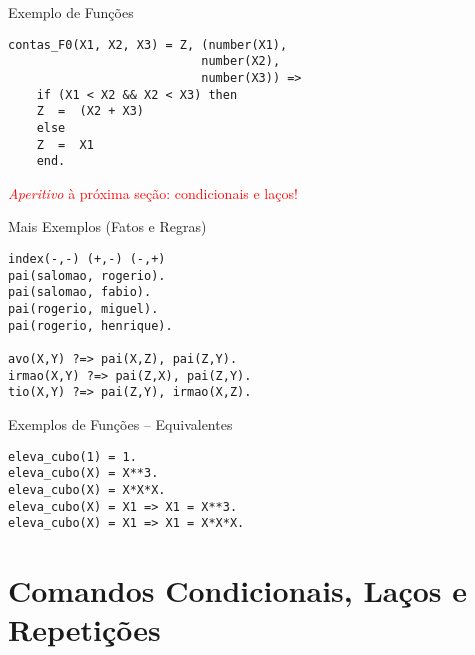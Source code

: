 \begin{frame}[fragile]

\begin{block}{Exemplo de Funções}
     
\begin{lstlisting}[frame=single]
contas_F0(X1, X2, X3) = Z, (number(X1), 
                           number(X2), 
                           number(X3)) =>
    if (X1 < X2 && X2 < X3) then
    Z  =  (X2 + X3)
    else
    Z  =  X1
    end.
\end{lstlisting}
        
 \end{block}

\textcolor{red}{\textit{Aperitivo} à próxima seção: condicionais e laços!}
    
\end{frame}    
\begin{frame}[fragile]
   
\begin{block}{Mais Exemplos (Fatos e Regras)}
    
\begin{lstlisting}[frame=single]
index(-,-) (+,-) (-,+)
pai(salomao, rogerio).
pai(salomao, fabio).
pai(rogerio, miguel).
pai(rogerio, henrique).

avo(X,Y) ?=> pai(X,Z), pai(Z,Y).
irmao(X,Y) ?=> pai(Z,X), pai(Z,Y).
tio(X,Y) ?=> pai(Z,Y), irmao(X,Z).
\end{lstlisting}
    
 \end{block}
    
\end{frame}    
\begin{frame}[fragile]
    
\begin{block}{Exemplos de Funções -- Equivalentes}
    
\begin{lstlisting}[frame=single]
eleva_cubo(1) = 1.
eleva_cubo(X) = X**3.
eleva_cubo(X) = X*X*X.
eleva_cubo(X) = X1 => X1 = X**3.
eleva_cubo(X) = X1 => X1 = X*X*X.
\end{lstlisting}
        
\end{block}
    
\end{frame}

\section{Comandos Condicionais, Laços e Repetições}

